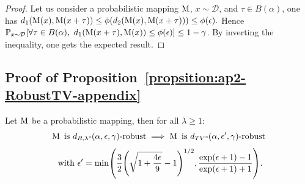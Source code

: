 \begin{proof}
Let us consider a probabilistic mapping $\operatorname*{M}$, $x \sim \mathcal{D}$, and $\tau \in B(\alpha)$, one has $d_{1}(\operatorname*{M}(x),\operatorname*{M}(x +\tau)) \leq \phi(d_{2}(\operatorname*{M}(x),\operatorname*{M}(x +\tau))) \leq \phi(\epsilon).$ Hence  $\mathbb{P}_{x\sim\mathcal{D}}\left[ \forall \tau \in B(\alpha),\ d_1(\probmap(x+\tau),\probmap(x)) \leq \phi(\epsilon) \right] \leq 1-\gamma$. By inverting the inequality, one gets the expected result.
\end{proof}

\subsection{Proof of Proposition~\ref{propsition:ap2-RobustTV-appendix}}


\begin{proposition}
\label{propsition:ap2-RobustTV-appendix}
Let $\operatorname*{M}$ be a probabilistic mapping, then for all $\lambda\geq1$:
$$\operatorname*{M} \text{ is }  d_{R,\lambda}\text{-}(\alpha, \epsilon, \gamma)\text{-robust} \implies \operatorname*{M} \text{ is } d_{TV}\text{-}(\alpha, \epsilon', \gamma)\text{-robust}$$
$$\textnormal{ with } \epsilon' = \min \left(\frac{3}{2}\left(\sqrt{1 + \frac{4\epsilon}{9}} - 1\right)^{1/2}, \frac{\exp(\epsilon +1) -1}{\exp(\epsilon +1) +1}\right).$$


\end{proposition}



